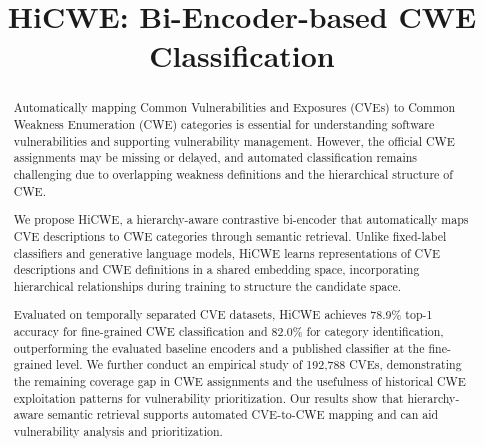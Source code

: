 \documentclass[conference,compsoc]{IEEEtran}
\begin{document}
\title{HiCWE: Bi-Encoder-based CWE Classification}
\author{
}
\maketitle







\begin{abstract}
Automatically mapping Common Vulnerabilities and Exposures
(CVEs) to Common Weakness Enumeration (CWE) categories is
essential for understanding software vulnerabilities and
supporting vulnerability management. However, the official CWE
assignments may be missing or delayed, and automated
classification remains challenging due to overlapping
weakness definitions and the hierarchical structure of CWE.

We propose HiCWE, a hierarchy-aware
contrastive bi-encoder that automatically maps CVE
descriptions to CWE categories through semantic retrieval.
Unlike fixed-label classifiers and generative language
models, HiCWE learns representations of CVE descriptions
and CWE definitions in a shared embedding space,
incorporating hierarchical relationships during training to
structure the candidate space.

Evaluated on temporally separated CVE datasets, HiCWE
achieves 78.9\% top-1 accuracy for fine-grained CWE
classification and 82.0\% for category identification,
outperforming the evaluated baseline encoders and a
published classifier at the fine-grained level.
We further conduct an empirical study of 192,788 CVEs,
demonstrating the remaining coverage gap in CWE assignments
and the usefulness of historical CWE exploitation patterns
for vulnerability prioritization. Our results show that
hierarchy-aware semantic retrieval supports automated
CVE-to-CWE mapping and can aid vulnerability analysis and
prioritization.
\end{abstract}
\end{document}
